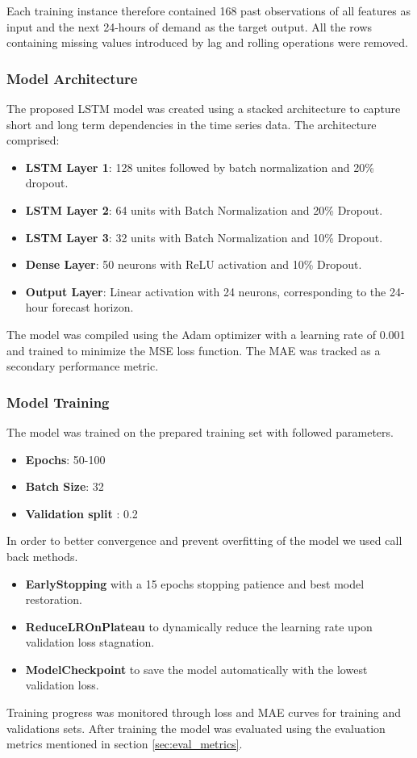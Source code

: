  Each training instance therefore contained 168 past observations of all features as input and the next 24-hours of demand as the target output. All the rows containing missing values introduced by lag and rolling operations were removed.
 
 \subsubsection{Model Architecture}
 
 The proposed LSTM model was created using a stacked architecture to capture short and long term dependencies in the time series data. The architecture comprised: 
 \begin{itemize}
 	\item \textbf{LSTM Layer 1}: 128 unites followed by batch normalization and 20\% dropout.
 	\item \textbf{LSTM Layer 2}: 64 units with Batch Normalization and 20\% Dropout.
 	
 	\item\textbf{LSTM Layer 3}: 32 units with Batch Normalization and 10\% Dropout.
 	
 	\item \textbf{Dense Layer}: 50 neurons with ReLU activation and 10\% Dropout.
 	
   \item\textbf{ Output Layer}: Linear activation with 24 neurons, corresponding to the 24-hour forecast horizon.
 \end{itemize}
 
 
 The model was compiled using the Adam optimizer with a learning rate of 0.001 and trained to minimize the MSE loss function. The MAE was tracked as a secondary performance metric.
 
 \subsubsection{Model Training}The model was trained on the prepared training set with followed parameters.
 \begin{itemize}
 	\item \textbf{Epochs}:  50-100
 	\item \textbf{Batch Size}:  32
 	\item\textbf{ Validation split} : 0.2
 	\end{itemize}
 	
 	In order to better convergence and prevent overfitting of the model we used call back methods. 
 	\begin{itemize}
 		\item \textbf{EarlyStopping} with a  15 epochs stopping patience and best model restoration.
 		\item \textbf{ReduceLROnPlateau} to dynamically reduce the learning rate upon validation loss stagnation.
 		\item \textbf{ModelCheckpoint} to save the model automatically with the lowest validation loss.
 	\end{itemize}
 	Training progress was monitored through loss and MAE curves for training and validations sets. After training the model was evaluated using the evaluation metrics mentioned in section \ref{sec:eval_metrics}.
 	
